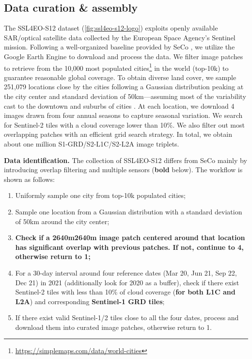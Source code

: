 \documentclass[lettersize,journal]{IEEEtran}
\begin{document}
\subsection{Data curation \& assembly}
\label{sec:datacuration}
The SSL4EO-S12 dataset (\cref{fig:ssl4eo-s12-logo}) exploits openly available SAR/optical satellite data collected by the European Space Agency's Sentinel mission. Following a well-organized baseline provided by SeCo \cite{manas2021seasonal}, we utilize the Google Earth Engine \citep{gorelick2017google} to download and process the data. We filter image patches to retrieve from the 10,000 most populated cities\footnote{\url{https://simplemaps.com/data/world-cities}} in the world (top-10k) to guarantee reasonable global coverage. To obtain diverse land cover, we sample 251,079 locations close by the cities following a Gaussian distribution peaking at the city center and standard deviation of 50km---assuming most of the variability cast to the downtown and suburbs of cities \citep{manas2021seasonal}. At each location, we download 4 images drawn from four annual seasons to capture seasonal variation. We search for Sentinel-2 tiles with a cloud coverage lower than 10\%. We also filter out most overlapping patches with an efficient grid search strategy. In total, we obtain about one million S1-GRD/S2-L1C/S2-L2A image triplets.

\textbf{Data identification.} The collection of SSL4EO-S12 differs from SeCo mainly by introducing overlap filtering and multiple sensors (\textbf{bold} below). The workflow is shown as follows:

\begin{enumerate}
\small
    \item Uniformly sample one city from top-10k populated cities;
    \vspace{0.2em}
    \item Sample one location from a Gaussian distribution with a standard deviation of 50km around the city center;
    \vspace{0.2em}
    \item \textbf{Check if a 2640m2640m image patch centered around that location has significant overlap with previous patches. If not, continue to 4, otherwise return to 1;}
    \vspace{0.2em}
    \item For a 30-day interval around four reference dates (Mar 20, Jun 21, Sep 22, Dec 21) in 2021 (additionally look for 2020 as a buffer), check if there exist Sentinel-2 tiles with less than 10\% of cloud coverage (\textbf{for both L1C and L2A}) and corresponding \textbf{Sentinel-1 GRD tiles};
    \vspace{0.2em}
    \item If there exist valid Sentinel-1/2 tiles close to all the four dates, process and download them into curated image patches, otherwise return to 1.
\end{enumerate}
\end{document}
